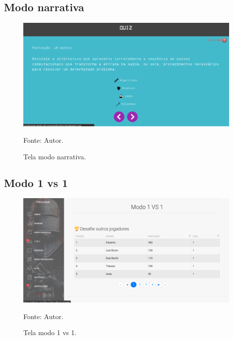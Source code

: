 \subsection{Modo narrativa}
\begin{figure}[h]
	\centering
	\includegraphics[keepaspectratio=true,scale=0.32]{figuras/g.png}
	\caption{Tela modo narrativa.}
	Fonte: Autor.
	\label{figurag}
\end{figure}

\subsection{Modo 1 vs 1}
\begin{figure}[h]
	\centering
	\includegraphics[keepaspectratio=true,scale=0.32]{figuras/h.png}
	\caption{Tela modo 1 vs 1.}
	Fonte: Autor.
	\label{figurah}
\end{figure}

\pagebreak


